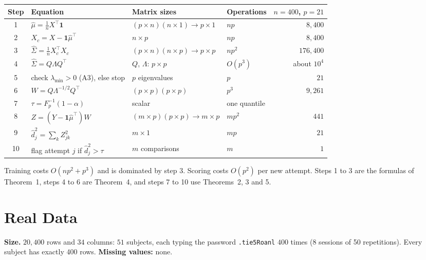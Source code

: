 \documentclass[11pt]{article}
\newcommand{\one}{\mathbf{1}}
\newcommand{\T}{^{\top}}
\newcommand{\hSigma}{\hat{\Sigma}}
\newcommand{\hmu}{\hat{\mu}}
\theoremstyle{plain}
\theoremstyle{definition}
\theoremstyle{remark}
\begin{document}
\begin{table}[H]
\centering\small
\begin{tabularx}{\linewidth}{@{}c>{\raggedright\arraybackslash}p{4.4cm}>{\raggedright\arraybackslash}X>{\raggedright\arraybackslash}p{2.1cm}r@{}}
\toprule
Step & Equation & Matrix sizes & Operations & $n{=}400$, $p{=}21$\\
\midrule
1 & $\hmu=\frac1nX\T\one$ & $(p\times n)(n\times1)\to p\times1$ & $np$ & $8{,}400$\\
2 & $X_c=X-\one\hmu\T$ & $n\times p$ & $np$ & $8{,}400$\\
3 & $\hSigma=\frac1nX_c\T X_c$ & $(p\times n)(n\times p)\to p\times p$ & $np^2$ & $176{,}400$\\
4 & $\hSigma=Q\Lambda Q\T$ & $Q$, $\Lambda$: $p\times p$ & $O(p^3)$ & about $10^4$\\
5 & check $\lambda_{\min}>0$ (A3), else stop & $p$ eigenvalues & $p$ & $21$\\
6 & $W=Q\Lambda^{-1/2}Q\T$ & $(p\times p)(p\times p)$ & $p^3$ & $9{,}261$\\
7 & $\tau=F_p^{-1}(1-\alpha)$ & scalar & one quantile & \\
\midrule
8 & $Z=(Y-\one\hmu\T)W$ & $(m\times p)(p\times p)\to m\times p$ & $mp^2$ & $441$\\
9 & $\hat d_j^2=\sum_kZ_{jk}^2$ & $m\times1$ & $mp$ & $21$\\
10 & flag attempt $j$ if $\hat d_j^2>\tau$ & $m$ comparisons & $m$ & $1$\\
\bottomrule
\end{tabularx}
\end{table}

Training costs $O(np^2+p^3)$ and is dominated by step 3. Scoring costs $O(p^2)$ per
new attempt. Steps 1 to 3 are the formulas of Theorem~1, steps 4 to 6 are Theorem~4,
and steps 7 to 10 use Theorems~2, 3 and 5.

\section{Real Data}\label{sec:data}
\textbf{Size.} $20{,}400$ rows and $34$ columns: $51$ subjects, each typing the
password \texttt{.tie5Roanl} $400$ times (8 sessions of 50 repetitions). Every
subject has exactly 400 rows. \textbf{Missing values:} none.
\end{document}
